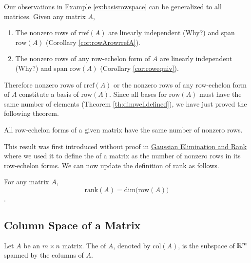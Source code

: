 \documentclass{ximera}
\begin{document}
Our observations in Example \ref{ex:basisrowspace} can be generalized to all matrices.  Given any matrix $A$,
\begin{enumerate}
    \item The nonzero rows of $\mbox{rref}(A)$ are linearly independent (Why?) and span $\mbox{row}(A)$ (Corollary \ref{cor:rowArowrrefA}).
    \item The nonzero rows of any row-echelon form of $A$ are linearly independent (Why?) and span $\mbox{row}(A)$ (Corollary \ref{cor:rowequiv}).
\end{enumerate}
Therefore nonzero rows of $\mbox{rref}(A)$ or the nonzero rows of any row-echelon form of $A$ constitute a basis of $\mbox{row}(A)$.  Since all bases for $\mbox{row}(A)$ must have the same number of elements (Theorem \ref{th:dimwelldefined}), we have just proved the following theorem.

\begin{theorem}\label{th:samenumberofnonzerorows}
All row-echelon forms of a given matrix have the same number of nonzero rows.
\end{theorem}

This result was first introduced without proof in \href{https://ximera.osu.edu/linearalgebradzv3/LinearAlgebraInteractiveIntro/SYS-0030/main}{Gaussian Elimination and Rank} where we used it to define the  of a matrix as the number of nonzero rows in its row-echelon forms.  We can now update the definition of rank as follows.

\begin{definition}\label{th:dimofrowA}
For any matrix $A$,  
$$\mbox{rank}(A)=\mbox{dim}\Big(\mbox{row}(A)\Big)$$.
\end{definition}


\subsection*{Column Space of a Matrix}
\begin{definition}\label{def:colspace} Let $A$ be an $m\times n$ matrix.  The  of $A$, denoted by $\mbox{col}(A)$, is the subspace of $\mathbb{R}^m$ spanned by the columns of $A$.
\end{definition}
\end{document}
